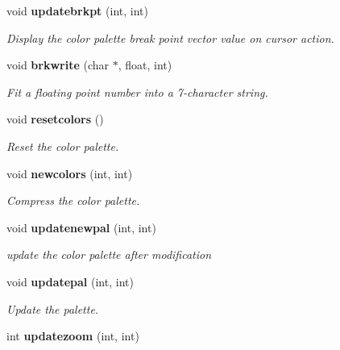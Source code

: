 \begin{CompactItemize}
void {\bf updatebrkpt} (int, int)
\begin{CompactList}\small\item\em Display the color palette break point vector value on cursor action. \item\end{CompactList}\item 
void {\bf brkwrite} (char $\ast$, float, int)
\begin{CompactList}\small\item\em Fit a floating point number into a 7-character string. \item\end{CompactList}\item 
void {\bf resetcolors} ()
\begin{CompactList}\small\item\em Reset the color palette. \item\end{CompactList}\item 
void {\bf newcolors} (int, int)
\begin{CompactList}\small\item\em Compress the color palette. \item\end{CompactList}\item 
void {\bf updatenewpal} (int, int)
\begin{CompactList}\small\item\em update the color palette after modification \item\end{CompactList}\item 
void {\bf updatepal} (int, int)
\begin{CompactList}\small\item\em Update the palette. \item\end{CompactList}\item 
int {\bf updatezoom} (int, int)\label{xtv_8h_a98}


\end{CompactItemize}
